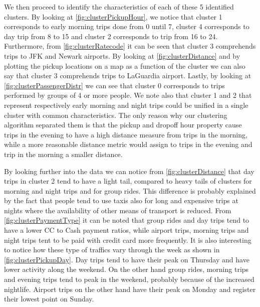 \documentclass{acm_proc_article-sp-sigmod09}
\begin{document}
We then proceed to identify the characteristics of each of these 5 identified clusters. By looking at \cref{fig:clusterPickupHour}, we notice that cluster 1 corresponds to early morning trips done from 0 until 7, cluster 4 corresponds to day trip from 8 to 15 and cluster 2 corresponds to trip from 16 to 24. Furthermore, from \cref{fig:clusterRatecode} it can be seen that cluster 3 comprehends trips to JFK and Newark airports. By looking at \cref{fig:clusterDistance} and by plotting the pickup locations on a map as a function of the cluster we can also say that cluster 3 comprehends trips to LaGuardia airport. Lastly, by looking at \cref{fig:clusterPassengerDistr} we can see that cluster 0 corresponds to trips performed by groups of 4 or more people. We note also that cluster 1 and 2 that represent respectively early morning and night trips could be unified in a single cluster with common characteristics. The only reason why our clustering algorithm separated them is that the pickup and dropoff hour property cause trips in the evening to have a high distance measure from trips in the morning, while a more reasonable distance metric would assign to trips in the evening and trip in the morning a smaller distance.

By looking further into the data we can notice from \cref{fig:clusterDistance} that day trips in cluster 2 tend to have a light tail, compared to heavy tails of clusters for morning and night trips and for group rides. This difference is probably explained by the fact that people tend to use taxis also for long and expensive trips at nights where the availability of other means of transport is reduced. From \cref{fig:clusterPaymentType} it can be noted that group rides and day trips tend to have a lower CC to Cash payment ratios, while airport trips, morning trips and night trips tent to be paid with credit card more frequently. It is also interesting to notice how these type of traffics vary through the week as shown in \cref{fig:clusterPickupDay}. Day trips tend to have their peak on Thursday and have lower activity along the weekend. On the other hand group rides, morning trips and evening trips tend to peak in the weekend, probably because of the increased nightlife. Airport trips on the other hand have their peak on Monday and register their lowest point on Sunday.
\end{document}
